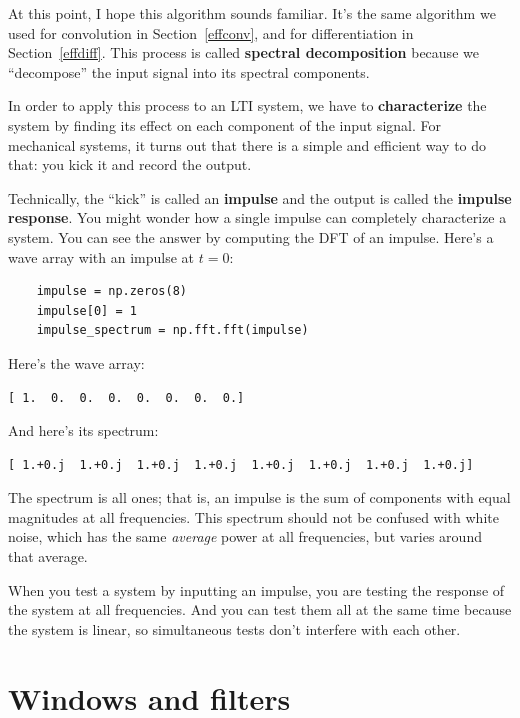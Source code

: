 \documentclass[12pt]{book}
\begin{document}
At this point, I hope this algorithm sounds familiar.  It's the
same algorithm we used for convolution in Section~\ref{effconv}, and
for differentiation in Section~\ref{effdiff}.  This process
is called {\bf spectral decomposition} because we ``decompose''
the input signal into its spectral components.

In order to apply this process to an LTI system, we have to {\bf
  characterize} the system by finding its effect on each component
of the input signal.  For mechanical systems, it turns out that there
is a simple and efficient way to do that: you kick it and record
the output.

Technically, the ``kick'' is called an {\bf impulse} and the
output is called the {\bf impulse response}.  You might wonder
how a single impulse can completely characterize a system.  You
can see the answer by computing the DFT of an impulse.  Here's
a wave array with an impulse at $t=0$:

\begin{verbatim}
    impulse = np.zeros(8)
    impulse[0] = 1
    impulse_spectrum = np.fft.fft(impulse)
\end{verbatim}

Here's the wave array:

\begin{verbatim}
[ 1.  0.  0.  0.  0.  0.  0.  0.]
\end{verbatim}

And here's its spectrum:

\begin{verbatim}
[ 1.+0.j  1.+0.j  1.+0.j  1.+0.j  1.+0.j  1.+0.j  1.+0.j  1.+0.j]
\end{verbatim}

The spectrum is all ones; that is, an impulse is the sum of components
with equal magnitudes at all frequencies.  This
spectrum should not be confused with white noise, which has the same
{\em average} power at all frequencies, but varies around that
average.

When you test a system by inputting
an impulse, you are testing the response of the 
system at all frequencies.  And you can test them all at the same
time because the system is linear, so simultaneous tests don't
interfere with each other.


\section{Windows and filters}
\label{winfilt}
\end{document}
